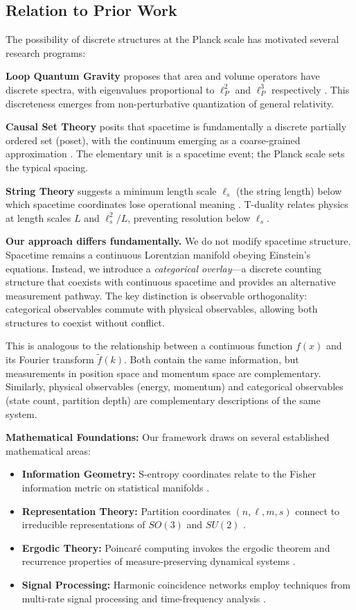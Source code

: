 \documentclass[twocolumn,10pt]{article}
\theoremstyle{remark}
\begin{document}
\subsection{Relation to Prior Work}

The possibility of discrete structures at the Planck scale has motivated several research programs:

\textbf{Loop Quantum Gravity} proposes that area and volume operators have discrete spectra, with eigenvalues proportional to $\ell_P^2$ and $\ell_P^3$ respectively \cite{rovelli2004,thiemann2007}. This discreteness emerges from non-perturbative quantization of general relativity.

\textbf{Causal Set Theory} posits that spacetime is fundamentally a discrete partially ordered set (poset), with the continuum emerging as a coarse-grained approximation \cite{sorkin2003}. The elementary unit is a spacetime event; the Planck scale sets the typical spacing.

\textbf{String Theory} suggests a minimum length scale $\ell_s$ (the string length) below which spacetime coordinates lose operational meaning \cite{polchinski1998}. T-duality relates physics at length scales $L$ and $\ell_s^2/L$, preventing resolution below $\ell_s$.

\textbf{Our approach differs fundamentally.} We do not modify spacetime structure. Spacetime remains a continuous Lorentzian manifold obeying Einstein's equations. Instead, we introduce a \textit{categorical overlay}---a discrete counting structure that coexists with continuous spacetime and provides an alternative measurement pathway. The key distinction is observable orthogonality: categorical observables commute with physical observables, allowing both structures to coexist without conflict.

This is analogous to the relationship between a continuous function $f(x)$ and its Fourier transform $\tilde{f}(k)$. Both contain the same information, but measurements in position space and momentum space are complementary. Similarly, physical observables (energy, momentum) and categorical observables (state count, partition depth) are complementary descriptions of the same system.

\textbf{Mathematical Foundations:}
Our framework draws on several established mathematical areas:
\begin{itemize}
    \item \textbf{Information Geometry:} S-entropy coordinates relate to the Fisher information metric on statistical manifolds \cite{amari2016}.
    \item \textbf{Representation Theory:} Partition coordinates $(n, \ell, m, s)$ connect to irreducible representations of $SO(3)$ and $SU(2)$ \cite{hall2015}.
    \item \textbf{Ergodic Theory:} Poincaré computing invokes the ergodic theorem and recurrence properties of measure-preserving dynamical systems \cite{walters1982}.
    \item \textbf{Signal Processing:} Harmonic coincidence networks employ techniques from multi-rate signal processing and time-frequency analysis \cite{cover2006}.
\end{itemize}
\end{document}
